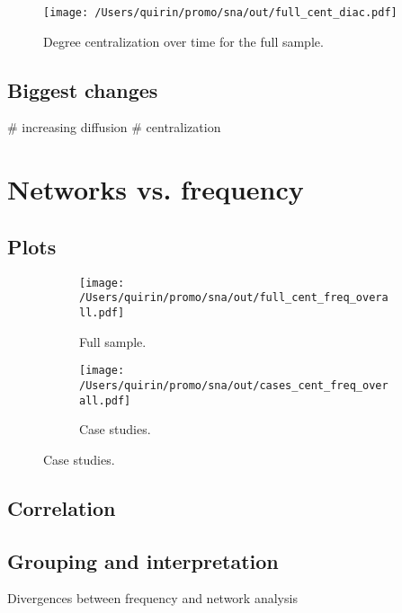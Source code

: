 \documentclass[
  a4paper,
  ]{scrartcl}
\begin{document}
    \begin{figure}
      \caption{Degree centralization over time for the full sample.}
      \centering
      \texttt{[image: /Users/quirin/promo/sna/out/full\_cent\_diac.pdf]}
    \end{figure}

  \subsection{Biggest changes}

    \begin{easylist}[itemize]
      # increasing diffusion
      # centralization
    \end{easylist}

\section{Networks vs. frequency}

  \subsection{Plots}

    \begin{figure}
      \centering
      \begin{subfigure}{.45\linewidth}
        \caption{Full sample.}
        \centering
        \texttt{[image: /Users/quirin/promo/sna/out/full\_cent\_freq\_overall.pdf]}
      \end{subfigure}
      \begin{subfigure}{.45\linewidth}
        \caption{Case studies.}
        \centering
        \texttt{[image: /Users/quirin/promo/sna/out/cases\_cent\_freq\_overall.pdf]}
      \end{subfigure}
    \end{figure}

  \subsection{Correlation}

  \subsection{Grouping and interpretation}

    Divergences between frequency and network analysis
\end{document}
